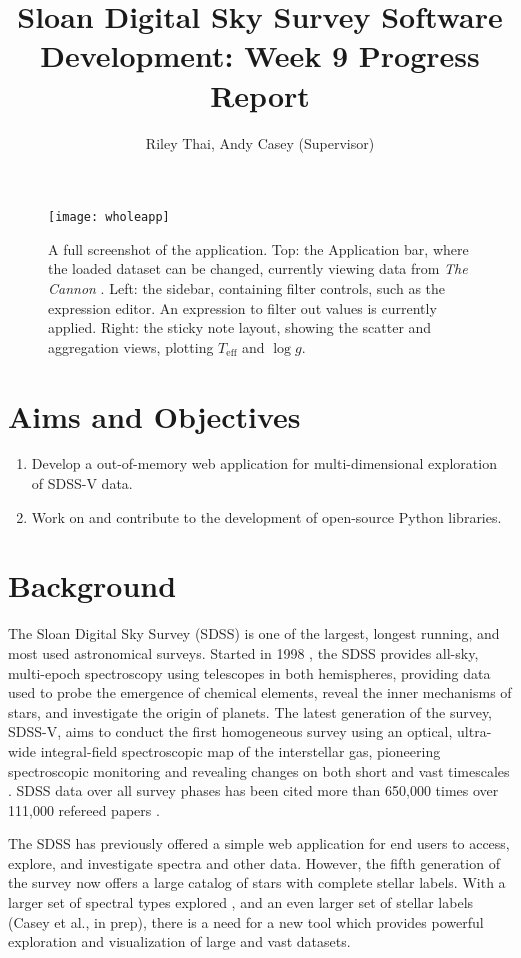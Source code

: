 \documentclass[a4paper,10pt,twocolumn]{article}
\title{Sloan Digital Sky Survey Software Development: Week 9 Progress Report}
\author{Riley Thai, Andy Casey (Supervisor)}
\begin{document}
\maketitle
\begin{figure*}
	\texttt{[image: wholeapp]}
	\caption{A full screenshot of the application. Top: the Application bar, where the loaded dataset can be changed, currently viewing data from \emph{The Cannon} \parencite{thecannon}. Left: the sidebar, containing filter controls, such as the expression editor. An expression to filter out values is currently applied. Right: the sticky note layout, showing the scatter and aggregation views, plotting $T_{\mathrm{eff}}$ and $\log g$.}
	\label{fig:wholeapp}
\end{figure*}
\section{Aims and Objectives}
\begin{enumerate}
	\item Develop a out-of-memory web application for multi-dimensional exploration of SDSS-V data.
	\item Work on and contribute to the development of open-source Python libraries.
\end{enumerate}

\section{Background}
The Sloan Digital Sky Survey (SDSS) is one of the largest, longest running, and most used astronomical surveys. Started in 1998 \parencite{dr18}, the SDSS provides all-sky, multi-epoch spectroscopy using telescopes in both hemispheres, providing data used to probe the emergence of chemical elements, reveal the inner mechanisms of stars, and investigate the origin of planets. The latest generation of the survey, SDSS-V, aims to conduct the first homogeneous survey using an optical, ultra-wide integral-field spectroscopic map of the interstellar gas, pioneering spectroscopic monitoring and revealing changes on both short and vast timescales \parencite{SDSS2017}. SDSS data over all survey phases has been cited more than 650,000 times over 111,000 refereed papers \parencite{dr18}.

The SDSS has previously offered a simple web application for end users to access, explore, and investigate spectra and other data. However, the fifth generation of the survey now offers a large catalog of stars with complete stellar labels. With a larger set of spectral types explored \parencite{apogee2017}, and an even larger set of stellar labels (Casey et al., in prep), there is a need for a new tool which provides powerful exploration and visualization of large and vast datasets.
\end{document}
